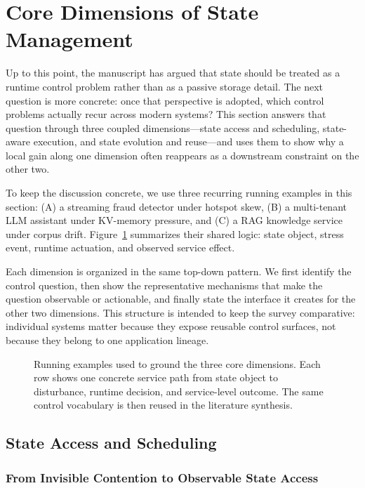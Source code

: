 \documentclass[acmsmall,screen,review]{acmart}
\begin{document}
\section{Core Dimensions of State Management}
\label{sec:core-dimensions}

Up to this point, the manuscript has argued that state should be treated as a runtime control problem rather than as a passive storage detail. The next question is more concrete: once that perspective is adopted, which control problems actually recur across modern systems? This section answers that question through three coupled dimensions---state access and scheduling, state-aware execution, and state evolution and reuse---and uses them to show why a local gain along one dimension often reappears as a downstream constraint on the other two.

To keep the discussion concrete, we use three recurring running examples in this section: (A) a streaming fraud detector under hotspot skew, (B) a multi-tenant LLM assistant under KV-memory pressure, and (C) a RAG knowledge service under corpus drift. Figure~\ref{fig:running-examples} summarizes their shared logic: state object, stress event, runtime actuation, and observed service effect.

Each dimension is organized in the same top-down pattern. We first identify the control question, then show the representative mechanisms that make the question observable or actionable, and finally state the interface it creates for the other two dimensions. This structure is intended to keep the survey comparative: individual systems matter because they expose reusable control surfaces, not because they belong to one application lineage.

\begin{figure}[t]
\centering
\resizebox{0.98\textwidth}{!}{}
\caption{Running examples used to ground the three core dimensions. Each row shows one concrete service path from state object to disturbance, runtime decision, and service-level outcome. The same control vocabulary is then reused in the literature synthesis.}
\label{fig:running-examples}
\end{figure}

\subsection{State Access and Scheduling}

\subsubsection{From Invisible Contention to Observable State Access}
\end{document}
